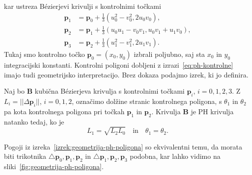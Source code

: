 \documentclass[isrm2, tisk]{fmfdelo}
\newcommand{\p}{\mathbf{p}}
\begin{document}
    kar ustreza Bézierjevi krivulji s kontrolnimi točkami
    \begin{align}
        \p_1 &=\p_0+\frac{1}{3}(u_0^2-v_0^2,2u_0v_0), \nonumber\\
        \p_2 &= \p_1+\frac{1}{3}(u_0u_1-v_0v_1, u_0v_1+u_1v_0),\label{eq:ph-kontrolne}\\
        \p_3 &= \p_2 + \frac{1}{3}(u_1^2-v_1^2, 2u_1v_1). \nonumber
    \end{align}
    Tukaj smo kontrolno točko $\p_0=(x_0,y_0)$ izbrali poljubno, saj sta $x_0$ in $y_0$ integracijski konstanti.
    Kontrolni poligoni dobljeni z izrazi~\eqref{eq:ph-kontrolne} imajo tudi geometrijsko interpretacijo.
    Brez dokaza podajmo izrek, ki jo definira.
    \begin{izrek}
        \label{izrek:geometrija-ph-poligona}
        Naj bo $\mathbf{B}$ kubična Bézierjeva krivulja s kontrolnimi točkami $\p_i$, $i=0,1,2,3$.
        Z $L_i=||\Delta \p_i||$, $i=0,1,2$, označimo dolžine stranic kontrolnega poligona, s $\theta_1$ in $\theta_2$ pa kota kontrolnega poligona pri točkah $\p_1$ in  $\p_2$.
        Krivulja $\mathbf{B}$ je PH krivulja natanko tedaj, ko je
        \[L_1=\sqrt{L_2L_0}\quad \text{in} \quad \theta_1=\theta_2 .\]
    \end{izrek}
    \noindent Pogoji iz izreka~\ref{izrek:geometrija-ph-poligona} so ekvivalentni temu, da morata biti trikotnika $\triangle \p_0,\p_1,\p_2$ in $\triangle \p_1,\p_2,\p_3$ podobna, kar lahko vidimo na sliki~\ref{fig:geometrija-ph-poligona}.
\end{document}
